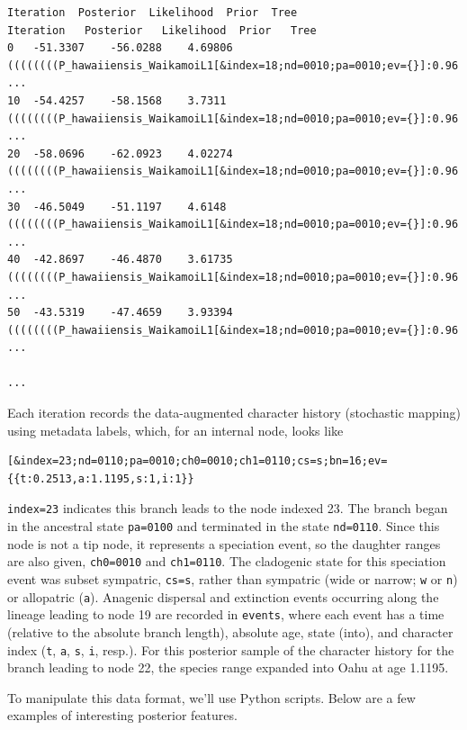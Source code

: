 \documentclass[11pt]{article}
\begin{document}
\begin{framed}
\begin{lstlisting}[basicstyle=\tiny \listingsfont, columns=texcl]
Iteration  Posterior  Likelihood  Prior  Tree
Iteration	Posterior	Likelihood	Prior	Tree
0	-51.3307	-56.0288	4.69806	((((((((P_hawaiiensis_WaikamoiL1[&index=18;nd=0010;pa=0010;ev={}]:0.96 ...
10	-54.4257	-58.1568	3.7311	((((((((P_hawaiiensis_WaikamoiL1[&index=18;nd=0010;pa=0010;ev={}]:0.96 ...
20	-58.0696	-62.0923	4.02274	((((((((P_hawaiiensis_WaikamoiL1[&index=18;nd=0010;pa=0010;ev={}]:0.96 ...
30	-46.5049	-51.1197	4.6148	((((((((P_hawaiiensis_WaikamoiL1[&index=18;nd=0010;pa=0010;ev={}]:0.96 ...
40	-42.8697	-46.4870	3.61735	((((((((P_hawaiiensis_WaikamoiL1[&index=18;nd=0010;pa=0010;ev={}]:0.96 ...
50	-43.5319	-47.4659	3.93394	((((((((P_hawaiiensis_WaikamoiL1[&index=18;nd=0010;pa=0010;ev={}]:0.96 ...

...
\end{lstlisting}
\end{framed}

Each iteration records the data-augmented character history (stochastic mapping) using metadata labels, which, for an internal node, looks like

\begin{snugshade}
\begin{lstlisting}
[&index=23;nd=0110;pa=0010;ch0=0010;ch1=0110;cs=s;bn=16;ev={{t:0.2513,a:1.1195,s:1,i:1}}
\end{lstlisting}
\end{snugshade}

{\tt index=23} indicates this branch leads to the node indexed 23.
The branch began in the ancestral state {\tt pa=0100} and terminated in the state {\tt nd=0110}.
Since this node is not a tip node, it represents a speciation event, so the daughter ranges are also given, {\tt ch0=0010} and {\tt ch1=0110}.
The cladogenic state for this speciation event was subset sympatric, {\tt cs=s}, rather than sympatric (wide or narrow; {\tt w} or  {\tt n}) or allopatric ({\tt a}).
Anagenic dispersal and extinction events occurring along the lineage leading to node 19 are recorded in {\tt events}, where each event has a time (relative to the absolute branch length), absolute age, state (into), and character index ({\tt t}, {\tt a}, {\tt s}, {\tt i}, resp.).
For this posterior sample of the character history for the branch leading to node 22, the species range expanded into Oahu at age 1.1195.

To manipulate this data format, we'll use Python scripts. Below are a few examples of interesting posterior features.
\end{document}
